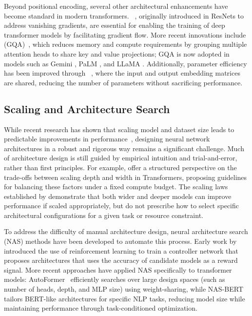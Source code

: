 Beyond positional encoding, several other architectural enhancements have become standard in modern transformers. ~\citep{he2016deep}, originally introduced in ResNets to address vanishing gradients, are essential for enabling the training of deep transformer models by facilitating gradient flow. More recent innovations include  (GQA)~\citep{ainslie2023gqa}, which reduces memory and compute requirements by grouping multiple attention heads to share key and value projections; GQA is now adopted in models such as Gemini \citep{deepmind2023gemini}, PaLM \citep{chowdhery2023palm}, and LLaMA \citep{touvron2023llama}. Additionally, parameter efficiency has been improved through ~\citep{press2017using}, where the input and output embedding matrices are shared, reducing the number of parameters without sacrificing performance.

\subsection{Scaling and Architecture Search}
While recent research has shown that scaling model and dataset size leads to predictable improvements in performance~\citep{kaplan2020scaling, henighan2020scaling}, designing neural network architectures in a robust and rigorous way remains a significant challenge. Much of architecture design is still guided by empirical intuition and trial-and-error, rather than first principles. For example, \citet{levine2020depth} offer a structured perspective on the trade-offs between scaling depth and width in Transformers, proposing guidelines for balancing these factors under a fixed compute budget. The scaling laws established by \citet{kaplan2020scaling} demonstrate that both wider and deeper models can improve performance if scaled appropriately, but do not prescribe how to select specific architectural configurations for a given task or resource constraint.

To address the difficulty of manual architecture design, neural architecture search (NAS) methods have been developed to automate this process. Early work by \citet{zoph2017neural} introduced the use of reinforcement learning to train a controller network that proposes architectures that uses the accuracy of candidate models as a reward signal. More recent approaches have applied NAS specifically to transformer models: AutoFormer~\citep{chen2021autoformer} efficiently searches over large design spaces (such as number of heads, depth, and MLP size) using weight-sharing, while NAS-BERT~\citep{xu2021nasbert} tailors BERT-like architectures for specific NLP tasks, reducing model size while maintaining performance through task-conditioned optimization.


